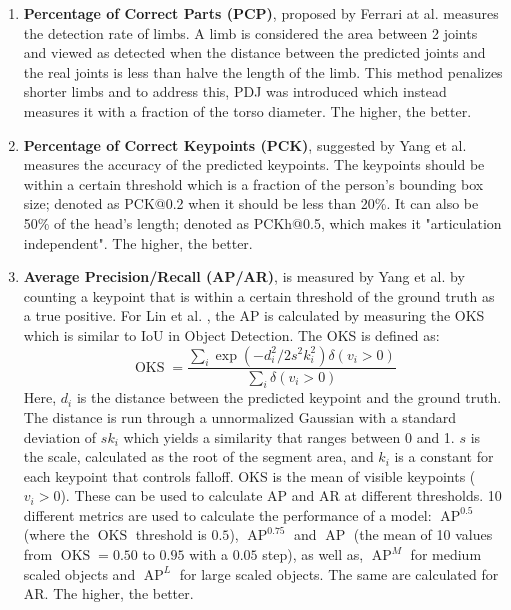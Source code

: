 \begin{enumerate}
	\item \textbf{Percentage of Correct Parts (PCP)}, proposed by Ferrari at al. \cite{Ferrari2008} measures the detection rate of limbs.
	A limb is considered the area between 2 joints and viewed as detected when the distance between the predicted joints and the real joints is less than halve the length of the limb.
	This method penalizes shorter limbs and to address this, \gls{PDJ} was introduced which instead measures it with a fraction of the torso diameter.
	The higher, the better.
	\item \textbf{Percentage of Correct Keypoints (PCK)}, suggested by Yang et al. \cite{Yang2013} measures the accuracy of the predicted keypoints.
	The keypoints should be within a certain threshold which is a fraction of the person's bounding box size; denoted as PCK@0.2 when it should be less than 20\%.
	It can also be 50\% of the head's length; denoted as PCKh@0.5, which makes it "articulation independent".
	The higher, the better.
	\item \textbf{Average Precision/Recall (AP/AR)}, is measured by Yang et al. \cite{Yang2013} by counting a keypoint that is within a certain threshold of the ground truth as a true positive.
	For Lin et al. \cite{Lin2014}, the AP is calculated by measuring the \gls{OKS} which is similar to \gls{IoU} in Object Detection.
	The \gls{OKS} is defined as:
	\begin{equation}
		\operatorname{OKS} = \frac{\sum_{i}\exp(-d_i^2/2s^2k_i^2)\delta(v_i > 0)}{\sum_i \delta(v_i > 0)}
	\end{equation}
	Here, $d_i$ is the distance between the predicted keypoint and the ground truth.
	The distance is run through a unnormalized Gaussian with a standard deviation of $sk_i$ which yields a similarity that ranges between 0 and 1.
	$s$ is the scale, calculated as the root of the segment area, and $k_i$ is a constant for each keypoint that controls falloff.
	\gls{OKS} is the mean of visible keypoints ($v_i > 0$).
	These can be used to calculate \gls{AP} and \gls{AR} at different thresholds.
	10 different metrics are used to calculate the performance of a model:
	$\operatorname{AP}^{0.5}$ (where the $\operatorname{OKS}$ threshold is $0.5$), $\operatorname{AP}^{0.75}$ and $\operatorname{AP}$ (the mean of 10 values from $\operatorname{OKS}=0.50$ to $0.95$ with a $0.05$ step), as well as, $\operatorname{AP}^{M}$ for medium scaled objects and $\operatorname{AP}^{L}$ for large scaled objects.
	The same are calculated for \gls{AR}.
	The higher, the better.
\end{enumerate}
